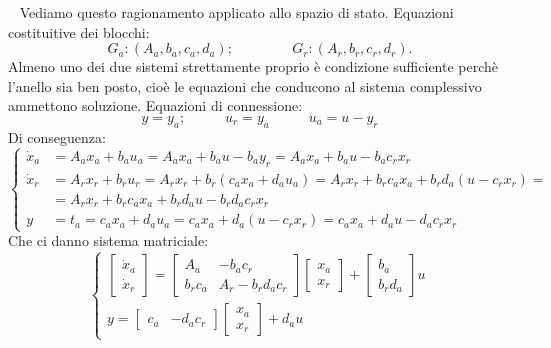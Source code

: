 \ \newline
Vediamo questo ragionamento applicato allo spazio di stato.\newline
\newline
Equazioni costituitive dei blocchi:
\[
    G_a : (A_a, b_a, c_a,d_a); \;\;\;\;\;\;\;\;\;\;\;\;\;\;\; G_r : (A_r, b_r,c_r,d_r).
\]
Almeno uno dei due sistemi strettamente proprio è condizione sufficiente perchè l'anello sia ben posto, cioè le equazioni che conducono al sistema complessivo ammettono soluzione.\newline
Equazioni di connessione:
\[
    y = y_a; \;\;\;\;\;\;\;\;\;\; u_r = y_a \;\;\;\;\;\;\;\;\;\; u_a = u - y_r
\]
Di conseguenza:
\[
    \begin{cases}
        \dot{x}_a &= A_a x_a + b_a u_a = A_a x_a + b_a u - b_a y_r = A_a x_a + b_a u - b_a c_r x_r\\
        \dot{x}_r &= A_r x_r + b_r u_r = A_r x_r + b_r(c_ax_a + d_au_a) = A_r x_r + b_rc_ax_a + b_r d_a (u-c_rx_r) =\\
         &= A_r x_r + b_r c_a x_a + b_r d_a u - b_rd_ac_rx_r\\
        y &= t_a = c_ax_a + d_au_a = c_a x_a + d_a(u-c_rx_r) = c_ax_a + d_a u - d_a c_rx_r
    \end{cases}
\]
Che ci danno sistema matriciale:
\[
    \begin{cases}
        \left[\begin{matrix}
            \dot{x}_a\\\dot{x}_r
        \end{matrix}\right] = \left[\begin{matrix}
            A_a & -b_ac_r \\ b_rc_a & A_r-b_rd_ac_r
        \end{matrix}\right] \left[\begin{matrix}
            x_a\\x_r
        \end{matrix}\right] + \left[\begin{matrix}
            b_a \\b_rd_a 
        \end{matrix}\right] u\\
        y = \left[\begin{matrix}
            c_a & -d_ac_r
        \end{matrix}\right] \left[\begin{matrix}
            x_a\\x_r
        \end{matrix}\right] + d_a u
    \end{cases}
\]